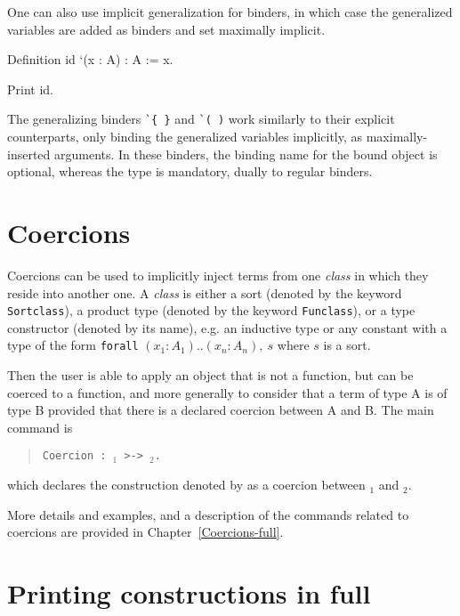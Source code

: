 One can also use implicit generalization for binders, in which case the
generalized variables are added as binders and set maximally implicit.
\begin{coq_example*}
Definition id `(x : A) : A := x.
\end{coq_example*}
\begin{coq_example}
Print id.
\end{coq_example}

The generalizing binders \texttt{\`{}\{ \}} and \texttt{\`{}( )} work similarly to
their explicit counterparts, only binding the generalized variables
implicitly, as maximally-inserted arguments. In these binders, the
binding name for the bound object is optional, whereas the type is
mandatory, dually to regular binders.

\section{Coercions
\label{Coercions}
}

Coercions can be used to implicitly inject terms from one {\em class} in
which they reside into another one. A {\em class} is either a sort
(denoted by the keyword {\tt Sortclass}), a product type (denoted by the
keyword {\tt Funclass}), or a type constructor (denoted by its name),
e.g. an inductive type or any constant with a type of the form
\texttt{forall} $(x_1:A_1) .. (x_n:A_n),~s$ where $s$ is a sort.

Then the user is able to apply an
object that is not a function, but can be coerced to a function, and
more generally to consider that a term of type A is of type B provided
that there is a declared coercion between A and B. The main command is
\begin{quote}
\tt Coercion {\qualid} : {\class$_1$} >-> {\class$_2$}.
\end{quote}
which declares the construction denoted by {\qualid} as a
coercion between {\class$_1$} and {\class$_2$}.

More details and examples, and a description of the commands related
to coercions are provided in Chapter~\ref{Coercions-full}.

\section[Printing constructions in full]{Printing constructions in full\label{SetPrintingAll}
}

